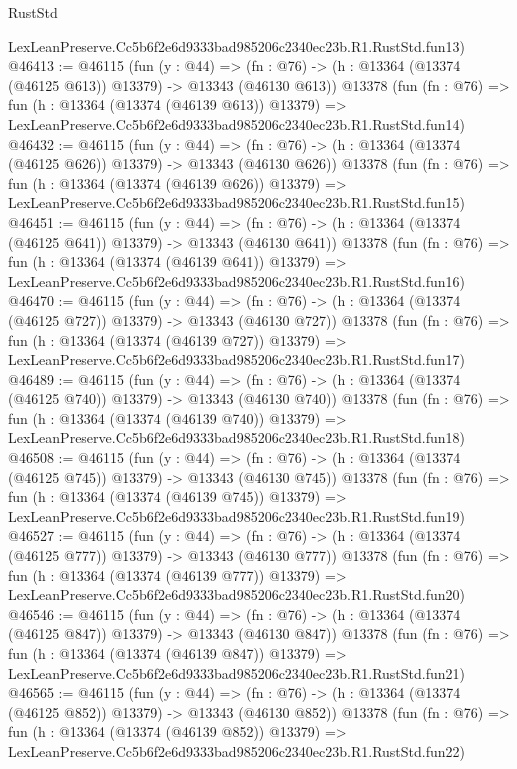 \begin{lexlean}{RustStd}
\begin{coremodule}
    LexLeanPreserve.Cc5b6f2e6d9333bad985206c2340ec23b.R1.RustStd.fun13)
@46413 := @46115
    (fun (y : @44) =>
    (fn : @76) -> (h : @13364 (@13374 (@46125 @613)) @13379) -> @13343 (@46130 @613))
    @13378
    (fun (fn : @76) =>
    fun (h : @13364 (@13374 (@46139 @613)) @13379) =>
    LexLeanPreserve.Cc5b6f2e6d9333bad985206c2340ec23b.R1.RustStd.fun14)
@46432 := @46115
    (fun (y : @44) =>
    (fn : @76) -> (h : @13364 (@13374 (@46125 @626)) @13379) -> @13343 (@46130 @626))
    @13378
    (fun (fn : @76) =>
    fun (h : @13364 (@13374 (@46139 @626)) @13379) =>
    LexLeanPreserve.Cc5b6f2e6d9333bad985206c2340ec23b.R1.RustStd.fun15)
@46451 := @46115
    (fun (y : @44) =>
    (fn : @76) -> (h : @13364 (@13374 (@46125 @641)) @13379) -> @13343 (@46130 @641))
    @13378
    (fun (fn : @76) =>
    fun (h : @13364 (@13374 (@46139 @641)) @13379) =>
    LexLeanPreserve.Cc5b6f2e6d9333bad985206c2340ec23b.R1.RustStd.fun16)
@46470 := @46115
    (fun (y : @44) =>
    (fn : @76) -> (h : @13364 (@13374 (@46125 @727)) @13379) -> @13343 (@46130 @727))
    @13378
    (fun (fn : @76) =>
    fun (h : @13364 (@13374 (@46139 @727)) @13379) =>
    LexLeanPreserve.Cc5b6f2e6d9333bad985206c2340ec23b.R1.RustStd.fun17)
@46489 := @46115
    (fun (y : @44) =>
    (fn : @76) -> (h : @13364 (@13374 (@46125 @740)) @13379) -> @13343 (@46130 @740))
    @13378
    (fun (fn : @76) =>
    fun (h : @13364 (@13374 (@46139 @740)) @13379) =>
    LexLeanPreserve.Cc5b6f2e6d9333bad985206c2340ec23b.R1.RustStd.fun18)
@46508 := @46115
    (fun (y : @44) =>
    (fn : @76) -> (h : @13364 (@13374 (@46125 @745)) @13379) -> @13343 (@46130 @745))
    @13378
    (fun (fn : @76) =>
    fun (h : @13364 (@13374 (@46139 @745)) @13379) =>
    LexLeanPreserve.Cc5b6f2e6d9333bad985206c2340ec23b.R1.RustStd.fun19)
@46527 := @46115
    (fun (y : @44) =>
    (fn : @76) -> (h : @13364 (@13374 (@46125 @777)) @13379) -> @13343 (@46130 @777))
    @13378
    (fun (fn : @76) =>
    fun (h : @13364 (@13374 (@46139 @777)) @13379) =>
    LexLeanPreserve.Cc5b6f2e6d9333bad985206c2340ec23b.R1.RustStd.fun20)
@46546 := @46115
    (fun (y : @44) =>
    (fn : @76) -> (h : @13364 (@13374 (@46125 @847)) @13379) -> @13343 (@46130 @847))
    @13378
    (fun (fn : @76) =>
    fun (h : @13364 (@13374 (@46139 @847)) @13379) =>
    LexLeanPreserve.Cc5b6f2e6d9333bad985206c2340ec23b.R1.RustStd.fun21)
@46565 := @46115
    (fun (y : @44) =>
    (fn : @76) -> (h : @13364 (@13374 (@46125 @852)) @13379) -> @13343 (@46130 @852))
    @13378
    (fun (fn : @76) =>
    fun (h : @13364 (@13374 (@46139 @852)) @13379) =>
    LexLeanPreserve.Cc5b6f2e6d9333bad985206c2340ec23b.R1.RustStd.fun22)

\end{coremodule}
\end{lexlean}

